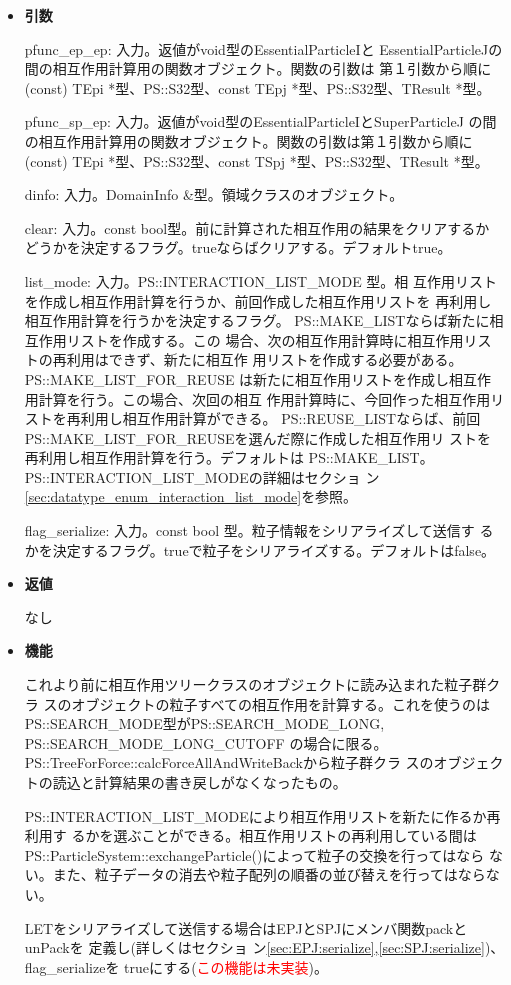 \begin{itemize}

\item {\bf 引数}

pfunc\_ep\_ep: 入力。返値がvoid型のEssentialParticleIと
EssentialParticleJの間の相互作用計算用の関数オブジェクト。関数の引数は
第１引数から順に(const) TEpi *型、PS::S32型、const
TEpj *型、PS::S32型、TResult *型。

pfunc\_sp\_ep: 入力。返値がvoid型のEssentialParticleIとSuperParticleJ
の間の相互作用計算用の関数オブジェクト。関数の引数は第１引数から順に
(const) TEpi *型、PS::S32型、const TSpj *型、PS::S32型、TResult *型。

dinfo: 入力。DomainInfo \&型。領域クラスのオブジェクト。

clear: 入力。const bool型。前に計算された相互作用の結果をクリアするか
どうかを決定するフラグ。trueならばクリアする。デフォルトtrue。

list\_mode: 入力。PS::INTERACTION\_LIST\_MODE 型。相
互作用リストを作成し相互作用計算を行うか、前回作成した相互作用リストを
再利用し相互作用計算を行うかを決定するフラグ。
PS::MAKE\_LISTならば新たに相互作用リストを作成する。この
場合、次の相互作用計算時に相互作用リストの再利用はできず、新たに相互作
用リストを作成する必要がある。PS::MAKE\_LIST\_FOR\_REUSE
は新たに相互作用リストを作成し相互作用計算を行う。この場合、次回の相互
作用計算時に、今回作った相互作用リストを再利用し相互作用計算ができる。
PS::REUSE\_LISTならば、前回
PS::MAKE\_LIST\_FOR\_REUSEを選んだ際に作成した相互作用リ
ストを再利用し相互作用計算を行う。デフォルトは
PS::MAKE\_LIST。PS::INTERACTION\_LIST\_MODEの詳細はセクショ
ン\ref{sec:datatype_enum_interaction_list_mode}を参照。

flag\_serialize: 入力。const bool 型。粒子情報をシリアライズして送信す
るかを決定するフラグ。trueで粒子をシリアライズする。デフォルトはfalse。

\item {\bf 返値}

なし

\item {\bf 機能}

これより前に相互作用ツリークラスのオブジェクトに読み込まれた粒子群クラ
スのオブジェクトの粒子すべての相互作用を計算する。これを使うのは
PS::SEARCH\_MODE型がPS::SEARCH\_MODE\_LONG, PS::SEARCH\_MODE\_LONG\_CUTOFF
の場合に限る。PS::TreeForForce::calcForceAllAndWriteBackから粒子群クラ
スのオブジェクトの読込と計算結果の書き戻しがなくなったもの。

PS::INTERACTION\_LIST\_MODEにより相互作用リストを新たに作るか再利用す
るかを選ぶことができる。相互作用リストの再利用している間は
PS::ParticleSystem::exchangeParticle()によって粒子の交換を行ってはなら
ない。また、粒子データの消去や粒子配列の順番の並び替えを行ってはならな
い。

LETをシリアライズして送信する場合はEPJとSPJにメンバ関数packとunPackを
定義し(詳しくはセクショ
ン\ref{sec:EPJ:serialize},\ref{sec:SPJ:serialize})、flag\_serializeを
trueにする(\textcolor{red}{この機能は未実装})。

\end{itemize}

